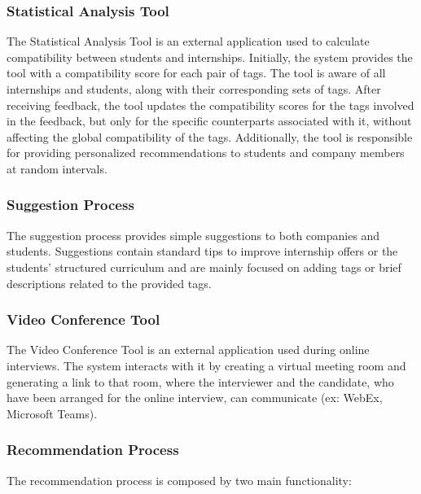 \subsubsection{Statistical Analysis Tool}

The Statistical Analysis Tool is an external application used to calculate compatibility between students and internships. Initially, 
the system provides the tool with a compatibility score for each pair of tags. The tool is aware of all internships and students, along 
with their corresponding sets of tags. After receiving feedback, the tool updates the compatibility scores for the tags 
involved in the feedback, but only for the specific counterparts associated with it, without affecting the global compatibility of the 
tags. Additionally, the tool is responsible for providing personalized recommendations to students and company members at random intervals.

\subsubsection{Suggestion Process}

The suggestion process provides simple suggestions to both companies and students. Suggestions contain standard tips to improve internship offers or the students' structured 
curriculum and are mainly focused on adding tags or brief descriptions related to the provided tags.

\subsubsection{Video Conference Tool}

The Video Conference Tool is an external application used during online interviews. The system interacts with it by creating a virtual meeting room and generating a link 
to that room, where the interviewer and the candidate, who have been arranged for the online interview, can communicate (ex: WebEx, Microsoft Teams).


\subsubsection{Recommendation Process} 

The recommendation process is composed by two main functionality: 

